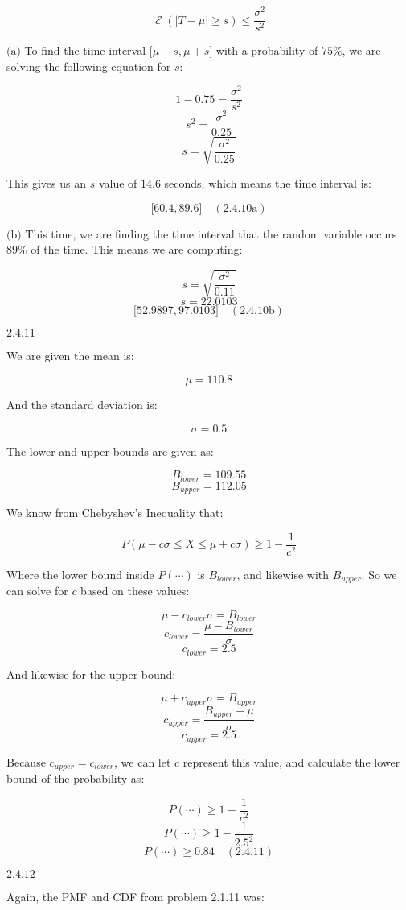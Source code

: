 \documentclass{article}
\newcommand{\problem}[2]{$\boxed{\text{#1.#2}}$}
\newcommand{\subproblem}[3]{$\boxed{\text{(#3)}}$}
\newcommand{\solution}[3]{\boxed{#3\quad(\text{#1.#2})}}
\newcommand{\subsolution}[4]{\boxed{#4\quad(\text{#1.#2#3})}}
\DeclareMathOperator{\E}{\mathcal{E}}
\begin{document}
\[
\E(|T-\mu|\ge s)\le \frac{\sigma^2}{s^2}
\]

%
\subproblem{2.4}{10}{a} To find the time interval
$\lbrack\mu-s,\mu+s\rbrack$ with a probability of $75\%$, we are
solving the following equation for $s$:

\[
1-0.75=\frac{\sigma^2}{s^2}
\] \[
s^2=\frac{\sigma^2}{0.25}
\] \[
s=\sqrt{\frac{\sigma^2}{0.25}}
\]

This gives us an $s$ value of $14.6$ seconds, which means the time
interval is:

\[
\subsolution{2.4}{10}{a}{\lbrack60.4,89.6\rbrack}
\]

%
\subproblem{2.4}{10}{b} This time, we are finding the time interval
that the random variable occurs $89\%$ of the time. This means we are
computing:

\[
s=\sqrt{\frac{\sigma^2}{0.11}}
\] \[
s=22.0103
\] \[
\subsolution{2.4}{10}{b}{\lbrack52.9897,97.0103\rbrack}
\]

%
\problem{2.4}{11}

We are given the mean is:

\[
\mu=110.8
\]

And the standard deviation is:

\[
\sigma=0.5
\]

The lower and upper bounds are given as:

\[
B_{lower}=109.55
\] \[
B_{upper}=112.05
\]

We know from Chebyshev's Inequality that:

\[
P(\mu-c\sigma \le X \le \mu+c\sigma)\ge 1-\frac{1}{c^2}
\]

Where the lower bound inside $P(\cdots)$ is $B_{lower}$, and likewise
with $B_{upper}$. So we can solve for $c$ based on these values:

\[
\mu-c_{lower}\sigma = B_{lower}
\] \[
c_{lower}=\frac{\mu-B_{lower}}{\sigma}
\] \[
c_{lower}=2.5
\]

And likewise for the upper bound:

\[
\mu+c_{upper}\sigma=B_{upper}
\] \[
c_{upper}=\frac{B_{upper}-\mu}{\sigma}
\] \[
c_{upper}=2.5
\]

Because $c_{upper}=c_{lower}$, we can let $c$ represent this value,
and calculate the lower bound of the probability as:

\[
P(\cdots)\ge 1-\frac{1}{c^2}
\] \[
P(\cdots)\ge 1-\frac{1}{2.5^2}
\] \[
\solution{2.4}{11}{P(\cdots)\ge0.84}
\]

%
\problem{2.4}{12}

Again, the PMF and CDF from problem 2.1.11 was:
\end{document}
